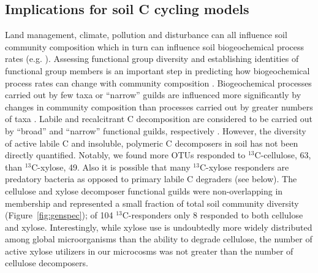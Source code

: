 \subsection{Implications for soil C cycling models}
Land management, climate, pollution and disturbance can all influence soil
community composition \citep{McGuire2010} which in turn can influence soil
biogeochemical process rates (e.g. \citep{Berlemont2014a}). Assessing
functional group diversity and establishing identities of functional group
members is an important step in predicting how biogeochemical process rates can
change with community composition \citep{Schimel_1995,McGuire2010}. 
Biogeochemical processes carried out by few taxa or ``narrow'' guilds are
influenced more significantly by changes in community composition than
processes carried out by greater numbers of taxa
\citep{Schimel_1995,McGuire2010}. Labile and recalcitrant C decomposition are
considered to be carried out by ``broad'' and ``narrow'' functional guilds,
respectively \citep{Schimel_1995,McGuire2010}. However, the diversity of active
labile C and insoluble, polymeric C decomposers in soil has not been directly
quantified. Notably, we found more OTUs responded to $^{13}$C-cellulose, 63,
than $^{13}$C-xylose, 49. Also it is possible that many $^{13}$C-xylose
responders are predatory bacteria as opposed to primary labile C degraders (see
below). The cellulose and xylose decomposer functional guilds were
non-overlapping in membership and represented a small fraction of total soil
community diversity (Figure~\ref{fig:genspec}); of 104 $^{13}$C-responders only
8 responded to both cellulose and xylose. Interestingly, while xylose use is
undoubtedly more widely distributed among global microorganisms than the
ability to degrade cellulose, the number of active xylose utilizers in our
microcosms was not greater than the number of cellulose decomposers.

